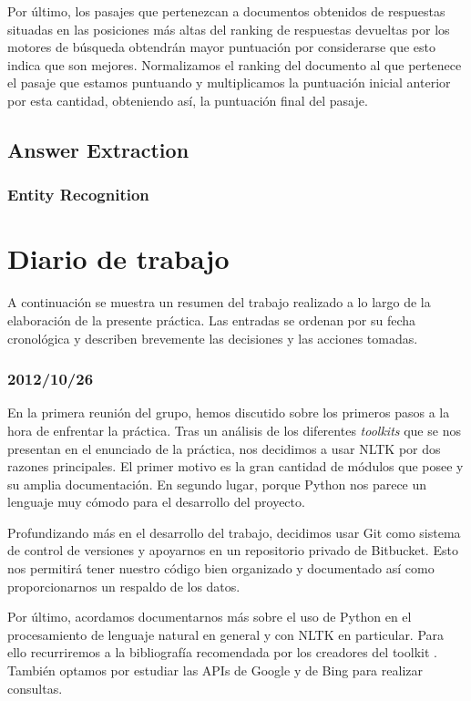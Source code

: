 \documentclass[12pt,a4paper,titlepage]{article}
\begin{document}
Por último, los pasajes que pertenezcan a documentos obtenidos de respuestas situadas en las posiciones más altas del ranking de respuestas devueltas por los motores de búsqueda obtendrán mayor puntuación por considerarse que esto indica que son mejores. Normalizamos el ranking del documento al que pertenece el pasaje que estamos puntuando y multiplicamos la puntuación inicial anterior por esta cantidad, obteniendo así, la puntuación final del pasaje.

\subsection{Answer Extraction}
\subsubsection{Entity Recognition}
\label{s:ne_recog}

\clearpage
\section{Diario de trabajo}
A continuación se muestra un resumen del trabajo realizado a lo largo de la elaboración de la presente práctica. Las entradas se ordenan por su fecha cronológica y describen brevemente las decisiones y las acciones tomadas.


\subsubsection*{2012/10/26}
En la primera reunión del grupo, hemos discutido sobre los primeros pasos a la hora de enfrentar la práctica. Tras un análisis de los diferentes \emph{toolkits} que se nos presentan en el enunciado de la práctica, nos decidimos a usar NLTK por dos razones principales. El primer motivo es la gran cantidad de módulos que posee y su amplia documentación. En segundo lugar, porque Python nos parece un lenguaje muy cómodo para el desarrollo del proyecto.

Profundizando más en el desarrollo del trabajo, decidimos usar Git como sistema de control de versiones y apoyarnos en un repositorio privado de Bitbucket. Esto nos permitirá tener nuestro código bien organizado y documentado así como proporcionarnos un respaldo de los datos.

Por último, acordamos documentarnos más sobre el uso de Python en el procesamiento de lenguaje natural en general y con NLTK en particular. Para ello recurriremos a la bibliografía recomendada por los creadores del toolkit \cite{nltk-book}. También optamos por estudiar las APIs de Google y de Bing para realizar consultas.
\end{document}
